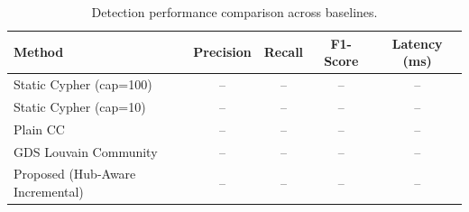 \begin{table}[t]
\centering
\caption{Detection performance comparison across baselines. }
\label{tab:baseline_comparison}
\begin{tabular}{lcccc}
\toprule
\textbf{Method} & \textbf{Precision} & \textbf{Recall} & \textbf{F1-Score} & \textbf{Latency (ms)} \\
\midrule
Static Cypher (cap=100) & -- & -- & -- & -- \\
Static Cypher (cap=10)  & -- & -- & -- & -- \\
Plain CC                & -- & -- & -- & -- \\
GDS Louvain Community   & -- & -- & -- & -- \\
\midrule
Proposed (Hub-Aware Incremental) & -- & -- & -- & -- \\
\bottomrule
\end{tabular}
\end{table}
